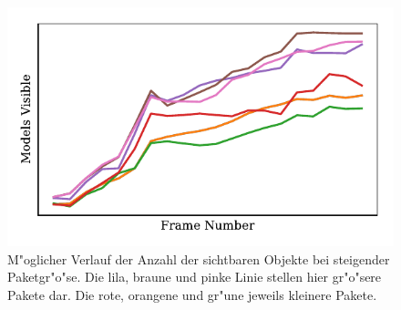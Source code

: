 \documentclass[journal]{vgtc}
\begin{document}
\begin{figure}
	\begin{minipage}{0.5\textwidth}
		\centering
		\includegraphics[width=\textwidth]{images/Evaluation_9_Results_Models Visible.pdf}
		\caption{M"oglicher Verlauf der Anzahl der sichtbaren Objekte bei steigender Paketgr"o"se. Die lila, braune und pinke Linie stellen hier gr"o"sere Pakete dar. Die rote, orangene und gr"une jeweils kleinere Pakete.}
	\label{fig:occludee_paket}
		\end{minipage}
\end{figure}
\end{document}

